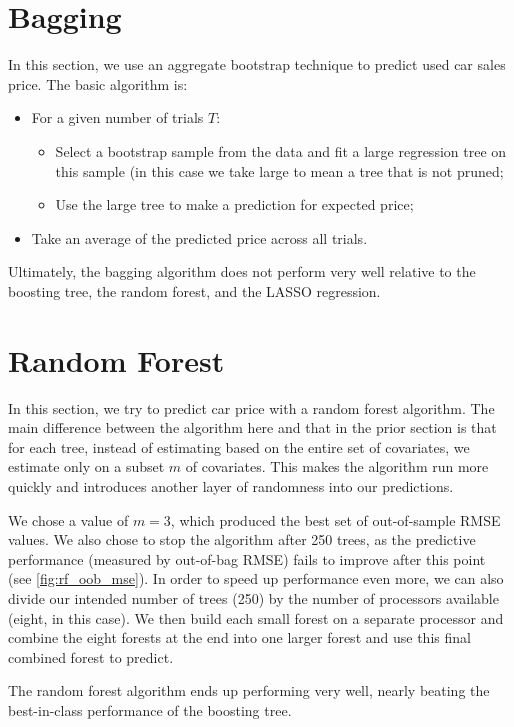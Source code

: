 \documentclass[11pt, fleqn]{article}
\begin{document}
\section{Bagging}

In this section, we use an aggregate bootstrap technique to predict used car sales price. The basic algorithm is:
\begin{itemize}
\item For a given number of trials $T$:
\begin{itemize}
\item Select a bootstrap sample from the data and fit a large regression tree on this sample (in this case we take large to mean a tree that is not pruned;
\item Use the large tree to make a prediction for expected price;
\end{itemize}
\item Take an average of the predicted price across all trials.
\end{itemize}

Ultimately, the bagging algorithm does not perform very well relative to the boosting tree, the random forest, and the LASSO regression. 

\section{Random Forest}

In this section, we try to predict car price with a random forest algorithm. The main difference between the algorithm here and that in the prior section is that for each tree, instead of estimating based on the entire set of covariates, we estimate only on a subset $m$ of covariates. This makes the algorithm run more quickly and introduces another layer of randomness into our predictions. 

We chose a value of $m=3$, which produced the best set of out-of-sample RMSE values. We also chose to stop the algorithm after 250 trees, as the predictive performance (measured by out-of-bag RMSE) fails to improve after this point (see \cref{fig:rf_oob_mse}). In order to speed up performance even more, we can also divide our intended number of trees (250) by the number of processors available (eight, in this case). We then build each small forest on a separate processor and combine the eight forests at the end into one larger forest and use this final combined forest to predict.

The random forest algorithm ends up performing very well, nearly beating the best-in-class performance of the boosting tree.
\end{document}
